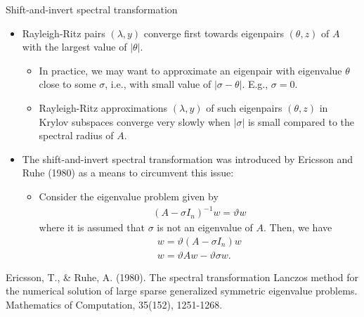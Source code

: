 \documentclass[t,usepdftitle=false]{beamer}
\begin{document}
\begin{frame}{Shift-and-invert spectral transformation}
	\begin{itemize}
	\item Rayleigh-Ritz pairs $(\lambda,y)$ converge first towards eigenpairs $(\theta,z)$ of $A$ with the largest value of $|\theta|$.
	\begin{itemize}\normalsize
	\item In practice, we may want to approximate an eigenpair with eigenvalue $\theta$ close to some $\sigma$, i.e., with small value of $|\sigma-\theta|$. E.g., $\sigma=0$.
	\item Rayleigh-Ritz approximations $(\lambda,y)$ of such eigenpairs $(\theta,z)$ in Krylov subspaces converge very slowly when $|\sigma|$ is small compared to the spectral radius of $A$.
	\end{itemize}
	\item The shift-and-invert spectral transformation was introduced by Ericsson and Ruhe (1980) as a means to circumvent this issue:
	\begin{itemize}\normalsize
	\item Consider the eigenvalue problem given by
	\begin{align*}
		(A-\sigma I_n)^{-1}w=\vartheta w 
	\end{align*}
	where it is assumed that $\sigma$ is not an eigenvalue of $A$. Then, we have
	\begin{align*}
		w=\vartheta (A-\sigma I_n)w\\
		w=\vartheta Aw- \vartheta\sigma w.
	\end{align*}
	\end{itemize}
	\end{itemize}
	\medskip
	\tiny{Ericsson, T., \& Ruhe, A. (1980). The spectral transformation Lanczos method for the numerical solution of large sparse generalized symmetric eigenvalue problems. Mathematics of Computation, 35(152), 1251-1268.}
\end{frame}
\end{document}
